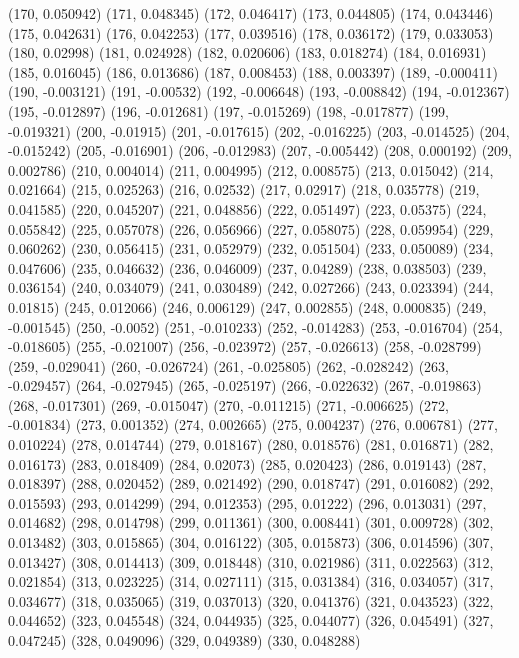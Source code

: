 (170, 0.050942)
(171, 0.048345)
(172, 0.046417)
(173, 0.044805)
(174, 0.043446)
(175, 0.042631)
(176, 0.042253)
(177, 0.039516)
(178, 0.036172)
(179, 0.033053)
(180, 0.02998)
(181, 0.024928)
(182, 0.020606)
(183, 0.018274)
(184, 0.016931)
(185, 0.016045)
(186, 0.013686)
(187, 0.008453)
(188, 0.003397)
(189, -0.000411)
(190, -0.003121)
(191, -0.00532)
(192, -0.006648)
(193, -0.008842)
(194, -0.012367)
(195, -0.012897)
(196, -0.012681)
(197, -0.015269)
(198, -0.017877)
(199, -0.019321)
(200, -0.01915)
(201, -0.017615)
(202, -0.016225)
(203, -0.014525)
(204, -0.015242)
(205, -0.016901)
(206, -0.012983)
(207, -0.005442)
(208, 0.000192)
(209, 0.002786)
(210, 0.004014)
(211, 0.004995)
(212, 0.008575)
(213, 0.015042)
(214, 0.021664)
(215, 0.025263)
(216, 0.02532)
(217, 0.02917)
(218, 0.035778)
(219, 0.041585)
(220, 0.045207)
(221, 0.048856)
(222, 0.051497)
(223, 0.05375)
(224, 0.055842)
(225, 0.057078)
(226, 0.056966)
(227, 0.058075)
(228, 0.059954)
(229, 0.060262)
(230, 0.056415)
(231, 0.052979)
(232, 0.051504)
(233, 0.050089)
(234, 0.047606)
(235, 0.046632)
(236, 0.046009)
(237, 0.04289)
(238, 0.038503)
(239, 0.036154)
(240, 0.034079)
(241, 0.030489)
(242, 0.027266)
(243, 0.023394)
(244, 0.01815)
(245, 0.012066)
(246, 0.006129)
(247, 0.002855)
(248, 0.000835)
(249, -0.001545)
(250, -0.0052)
(251, -0.010233)
(252, -0.014283)
(253, -0.016704)
(254, -0.018605)
(255, -0.021007)
(256, -0.023972)
(257, -0.026613)
(258, -0.028799)
(259, -0.029041)
(260, -0.026724)
(261, -0.025805)
(262, -0.028242)
(263, -0.029457)
(264, -0.027945)
(265, -0.025197)
(266, -0.022632)
(267, -0.019863)
(268, -0.017301)
(269, -0.015047)
(270, -0.011215)
(271, -0.006625)
(272, -0.001834)
(273, 0.001352)
(274, 0.002665)
(275, 0.004237)
(276, 0.006781)
(277, 0.010224)
(278, 0.014744)
(279, 0.018167)
(280, 0.018576)
(281, 0.016871)
(282, 0.016173)
(283, 0.018409)
(284, 0.02073)
(285, 0.020423)
(286, 0.019143)
(287, 0.018397)
(288, 0.020452)
(289, 0.021492)
(290, 0.018747)
(291, 0.016082)
(292, 0.015593)
(293, 0.014299)
(294, 0.012353)
(295, 0.01222)
(296, 0.013031)
(297, 0.014682)
(298, 0.014798)
(299, 0.011361)
(300, 0.008441)
(301, 0.009728)
(302, 0.013482)
(303, 0.015865)
(304, 0.016122)
(305, 0.015873)
(306, 0.014596)
(307, 0.013427)
(308, 0.014413)
(309, 0.018448)
(310, 0.021986)
(311, 0.022563)
(312, 0.021854)
(313, 0.023225)
(314, 0.027111)
(315, 0.031384)
(316, 0.034057)
(317, 0.034677)
(318, 0.035065)
(319, 0.037013)
(320, 0.041376)
(321, 0.043523)
(322, 0.044652)
(323, 0.045548)
(324, 0.044935)
(325, 0.044077)
(326, 0.045491)
(327, 0.047245)
(328, 0.049096)
(329, 0.049389)
(330, 0.048288)
